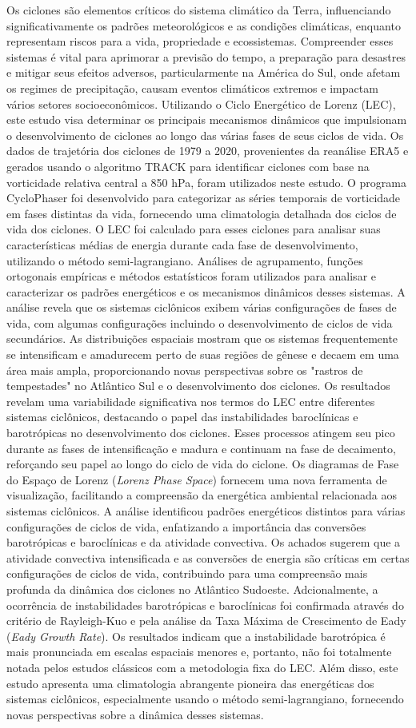 Os ciclones são elementos críticos do sistema climático da Terra, influenciando significativamente os padrões meteorológicos e as condições climáticas, enquanto representam riscos para a vida, propriedade e ecossistemas. Compreender esses sistemas é vital para aprimorar a previsão do tempo, a preparação para desastres e mitigar seus efeitos adversos, particularmente na América do Sul, onde afetam os regimes de precipitação, causam eventos climáticos extremos e impactam vários setores socioeconômicos. Utilizando  o Ciclo Energético de Lorenz (LEC), este estudo visa determinar os principais mecanismos dinâmicos que impulsionam o desenvolvimento de ciclones ao longo das várias fases de seus ciclos de vida. Os dados de trajetória dos ciclones de 1979 a 2020, provenientes da reanálise ERA5 e gerados usando o algoritmo TRACK para identificar ciclones com base na vorticidade relativa central a 850 hPa, foram utilizados neste estudo. O programa CycloPhaser foi desenvolvido para categorizar as séries temporais de vorticidade em fases distintas da vida, fornecendo uma climatologia detalhada dos ciclos de vida dos ciclones. O LEC foi calculado para esses ciclones para analisar suas características médias de energia durante cada fase de desenvolvimento, utilizando o método semi-lagrangiano. Análises de agrupamento, funções ortogonais empíricas e métodos estatísticos foram utilizados para analisar e caracterizar os padrões energéticos e os mecanismos dinâmicos desses sistemas. A análise revela que os sistemas ciclônicos exibem várias configurações de fases de vida, com algumas configurações incluindo o desenvolvimento de ciclos de vida secundários. As distribuições espaciais mostram que os sistemas frequentemente se intensificam e amadurecem perto de suas regiões de gênese e decaem em uma área mais ampla, proporcionando novas perspectivas sobre os "rastros de tempestades" no Atlântico Sul e o desenvolvimento dos ciclones. Os resultados revelam uma variabilidade significativa nos termos do LEC entre diferentes sistemas ciclônicos, destacando o papel das instabilidades baroclínicas e barotrópicas no desenvolvimento dos ciclones. Esses processos atingem seu pico durante as fases de intensificação e madura e continuam na fase de decaimento, reforçando seu papel ao longo do ciclo de vida do ciclone. Os diagramas de Fase do Espaço de Lorenz (\textit{Lorenz Phase Space}) fornecem uma nova ferramenta de visualização, facilitando a compreensão da energética ambiental relacionada aos sistemas ciclônicos. A análise identificou padrões energéticos distintos para várias configurações de ciclos de vida, enfatizando a importância das conversões barotrópicas e baroclínicas e da atividade convectiva. Os achados sugerem que a atividade convectiva intensificada e as conversões de energia são críticas em certas configurações de ciclos de vida, contribuindo para uma compreensão mais profunda da dinâmica dos ciclones no Atlântico Sudoeste. Adcionalmente, a ocorrência de instabilidades barotrópicas e baroclínicas foi confirmada através do critério de Rayleigh-Kuo e pela análise da Taxa Máxima de Crescimento de Eady (\textit{Eady Growth Rate}). Os resultados indicam que a instabilidade barotrópica é mais pronunciada em escalas espaciais menores e, portanto, não foi totalmente notada pelos estudos clássicos com a metodologia fixa do LEC. Além disso, este estudo apresenta uma climatologia abrangente pioneira das energéticas dos sistemas ciclônicos, especialmente usando o método semi-lagrangiano, fornecendo novas perspectivas sobre a dinâmica desses sistemas.
